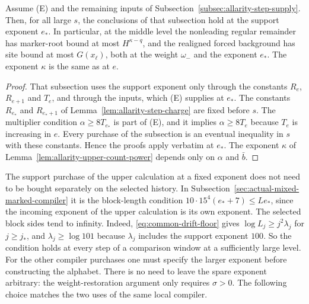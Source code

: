 \begin{lemma}
\label{lem:allarity-spare-run}
Assume (E) and the remaining inputs of
Subsection~\ref{subsec:allarity-step-supply}. Then, for all large $s$, the
conclusions of that subsection hold at the support exponent $e_*$. In
particular, at the middle level the nonleading regular remainder has
marker-root bound at most $H^{\kappa-q}$, and the realigned forced
background has site bound at most $G(x_\ell)$, both at the weight
$\omega_-$ and the exponent $e_*$. The exponent $\kappa$ is the same as at
$e$.
\end{lemma}
\begin{proof}
That subsection uses the support exponent only through the constants
$R_e$, $R_{e+1}$ and $T_e$, and through the inputs, which (E) supplies at
$e_*$. The constants $R_{e_*}$ and $R_{e_*+1}$ of
Lemma~\ref{lem:allarity-step-charge} are fixed before $s$. The multiplier
condition $\alpha\ge8T_{e_*}$ is part of (E), and it implies
$\alpha\ge8T_e$ because $T_e$ is increasing in $e$. Every purchase of the
subsection is an eventual inequality in $s$ with these constants. Hence the
proofs apply verbatim at $e_*$. The exponent $\kappa$ of
Lemma~\ref{lem:allarity-upper-count-power} depends only on $\alpha$ and
$\bar b$.
\end{proof}

The support purchase of the upper calculation at a fixed exponent does
not need to be bought separately on the selected history. In
Subsection~\ref{sec:actual-mixed-marked-compiler} it is the block-length
condition $10\cdot15^4(e_*+7)\le Le_*$, since the incoming exponent of the
upper calculation is its own exponent. The selected block sides tend to
infinity. Indeed, \eqref{eq:common-drift-floor} gives
$\log L_j\ge j^2\lambda_j$ for $j\ge j_*$, and $\lambda_j\ge\log101$
because $\lambda_j$ includes the support exponent $100$. So the condition
holds at every step of a comparison window at a sufficiently large level.
For the other compiler purchases one must specify the larger exponent
before constructing the alphabet. There is no need to leave the spare
exponent arbitrary: the weight-restoration argument only requires
$\sigma>0$. The following choice matches the two uses of the same
local compiler.

